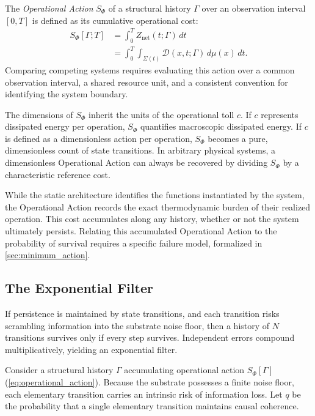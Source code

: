 The \emph{Operational Action} $S_{\Phi}$ of a structural history $\Gamma$ over an observation interval $[0,T]$ is defined as its cumulative operational cost:
\begin{equation}
\begin{split}
\label{eq:operational_action}
    S_{\Phi}[\Gamma;T]
    &= \int_0^T Z_{\mathrm{net}}(t;\Gamma)\,dt \\
    &= \int_0^T\int_{\Sigma(t)} 
      \mathcal{D}(x,t;\Gamma)\,d\mu(x)\,dt.
\end{split}
\end{equation}
Comparing competing systems requires evaluating this action over a common observation interval, a shared resource unit, and a consistent convention for identifying the system boundary.

The dimensions of $S_{\Phi}$ inherit the units of the operational toll $c$. If $c$ represents dissipated energy per operation, $S_{\Phi}$ quantifies macroscopic dissipated energy. If $c$ is defined as a dimensionless action per operation, $S_{\Phi}$ becomes a pure, dimensionless count of state transitions. In arbitrary physical systems, a dimensionless Operational Action can always be recovered by dividing $S_{\Phi}$ by a characteristic reference cost.

While the static architecture identifies the functions instantiated by the system, the Operational Action records the exact thermodynamic burden of their realized operation. This cost accumulates along any history, whether or not the system ultimately persists. Relating this accumulated Operational Action to the probability of survival requires a specific failure model, formalized in \cref{sec:minimum_action}.


\subsection{The Exponential Filter}
\label{subsec:exponential_filter}
If persistence is maintained by state transitions, and each transition risks scrambling information into the substrate noise floor, then a history of $N$ transitions survives only if every step survives. Independent errors compound multiplicatively, yielding an exponential filter.

Consider a structural history $\Gamma$ accumulating operational action $S_\Phi[\Gamma]$ (\cref{eq:operational_action}). Because the substrate possesses a finite noise floor, each elementary transition carries an intrinsic risk of information loss. Let $q$ be the probability that a single elementary transition maintains causal coherence.

